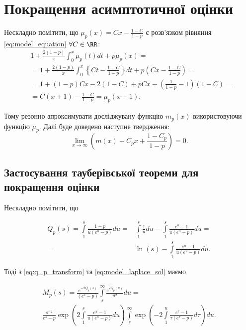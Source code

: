 \section{Покращення асимптотичної оцінки}

Нескладно помітити, що $\mu_{p}(x) = C x - \frac{1-C}{1 - p}$ є розв'язком рівняння \eqref{eq:model_equation} $\forall C \in \RR$:
\begin{align*}
&1 + \frac{2 (1-p)}{x} \int_{0}^{x} \mu_{p}(t) dt + p\mu_{p}(x) = \\
&=1 + \frac{2 (1-p)}{x} \int_{0}^{x} \left\{C t - \frac{1 - C}{1 - p} \right\} dt + p \left( C x - \frac{1 - C}{1 - p}\right) = \\
&=1 + (1 - p) C x - 2(1 - C) + p C x - (\frac{1}{1 - p} - 1)(1 - C) = \\
&= C(x + 1) - \frac{1 - C}{1 - p} = \mu_{p}(x+1).
\end{align*}

Тому резонно апроксимувати досліджувану функцію $m_{p}(x)$ використовуючи функцію $\mu_{p}$. Далі буде доведено наступне твердження:
\begin{equation}
\label{eq:fine_asymptotics_1}
\lim\limits_{x \rightarrow \infty} \left( m(x) - C_{p} x + \frac{1 - C_{p}}{1 - p} \right) = 0.
\end{equation}

\subsection{Застосування тауберівської теореми для покращення оцінки}

Нескладно помітити, що

\begin{align}
\label{eq:q_p_transform}
Q_{p}(s) = \int\limits_{1}^{s} \frac{1-p}{u(e^u - p)} du =& \int\limits_{1}^{s} \frac{1}{u} du - \int\limits_{1}^{s} \frac{e^u -1}{u(e^u - p)} du = \\
=& \ln(s) - \int\limits_{1}^{s} \frac{e^u -1}{u(e^u - p)} du.
\end{align}

Тоді з \eqref{eq:q_p_transform} та \eqref{eq:model_laplace_sol} маємо

\begin{gather*}
M_{p}(s) =\frac{e^{-2Q_p(s)}}{(e^s - p)} \int\limits_s^\infty \frac{e^{2Q_p(u)}}{u^2} du = \\
\frac{s^{-2}}{e^s-p} \exp \left(2 \int\limits_{1}^{s} \frac{e^u -1}{u(e^u - p)} du\right) \int\limits_s^\infty \exp\left(-2 \int\limits_{1}^{u} \frac{e^\tau -1}{\tau(e^\tau - p)} d\tau\right) du.
\end{gather*}

